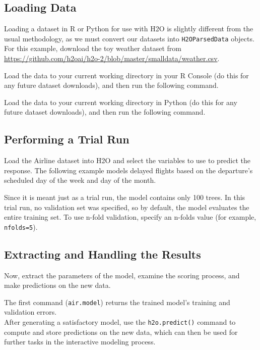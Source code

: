 \subsection{Loading Data}

Loading a dataset in R or Python for use with H2O is slightly different from the usual methodology, as we must convert
our datasets into \texttt{H2OParsedData} objects. For this example, download the toy weather dataset from
{\url{https://github.com/h2oai/h2o-2/blob/master/smalldata/weather.csv}}.

\waterExampleInR
Load the data to your current working directory in your R Console (do this for any future dataset downloads), and then run the following command.

\newpage
\waterExampleInPython
Load the data to your current working directory in Python (do this for any future dataset downloads), and then run the following command.

\subsection{Performing a Trial Run}
Load the Airline dataset into H2O and select the variables to use to predict  the
response. The following example models delayed flights based on the departure's scheduled day of the week and day of the month.

\waterExampleInR


\waterExampleInPython

\noindent
Since it is meant just as a trial run, the model contains only 100 trees. In this trial run, no validation set was
specified, so by default, the model evaluates the entire training set.  To use n-fold validation, specify an n-folds value (for example,
\texttt{nfolds=5}).

\subsection{Extracting and Handling the Results}

Now, extract the parameters of the model, examine the scoring process, and make predictions on the new data.
\newpage
\waterExampleInR


\waterExampleInPython


\noindent
The first command ({\texttt{air.model}}) returns the trained model's training and validation errors.
\\
After generating a satisfactory model, use the \texttt{h2o.predict()} command to compute and store predictions on the
new data, which can then be used for further tasks in the interactive modeling process.

